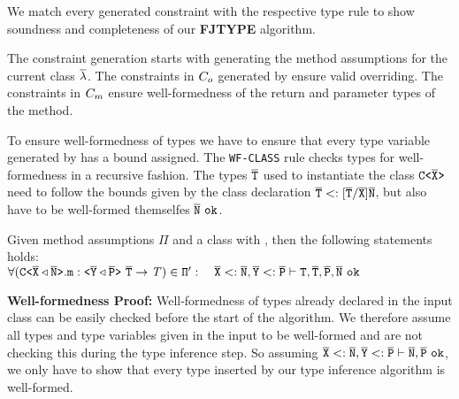 
We match every generated constraint with the respective type rule to show soundness and completeness of our \textbf{FJTYPE} algorithm.

The constraint generation starts with generating the method assumptions for the current class $\overline{\mathtt{\lambda}}$.
The constraints in $C_o$ generated by \fjtype{} ensure valid overriding.
The constraints in $C_m$ ensure well-formedness of the return and parameter types of the method.

To ensure well-formedness of types we have to ensure that every type variable generated by \fjtype{} has a bound assigned.
The \texttt{WF-CLASS} rule checks types for well-formedness in a recursive fashion.
The types $\overline{\tt T}$ used to instantiate the class $\mathtt{C \texttt{<} \overline{\tt X} \texttt{>} }$ need to follow the bounds given by the class declaration $\overline{\tt T} <: [\overline{\tt T}/\overline{\tt X}]\overline{\tt N}$, but also have to be well-formed themselfes $\overline{\tt N}\ \texttt{ok}$.
\begin{lemma}\label{lemma:well-formedness}
  Given method assumptions $\Pi$ and a class  with
  ,
  then the following statements holds:\\
  \normalfont $\forall (\exptype{C}{\ol{X} \triangleleft \ol{N}}.\texttt{m} : \exptype{}{\ol{Y} \triangleleft \ol{P}}\ \ol{\type{T}} \to \itype{T}) \in \mv{\Pi}': \quad \ol{X} <: \ol{N}, \ol{Y} <: \ol{P} \vdash \type{T}, \ol{T}, \ol{P}, \ol{N}\ \texttt{ok}$
\end{lemma}
\textbf{Well-formedness Proof:}
Well-formedness of types already declared in the input class can be easily checked before the start of the \fjtype{} algorithm.
We therefore assume all types and type variables given in the input to be well-formed and are not checking this during the type inference step.
So assuming $\ol{X} <: \ol{N}, \ol{Y} <: \ol{P} \vdash \ol{N}, \ol{P}\ \texttt{ok}$, we only have to show that every type inserted by our type inference algorithm is well-formed.

